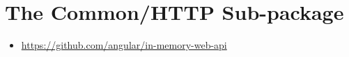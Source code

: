 \chapter{The Common/HTTP Sub-package}




\begin{itemize}
  \item \url{https://github.com/angular/in-memory-web-api}
\end{itemize}








